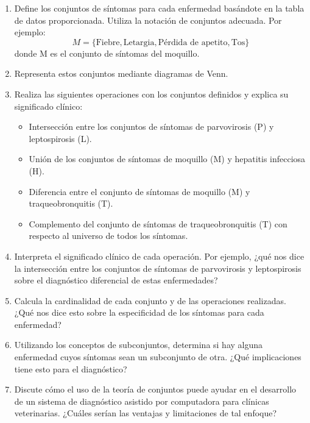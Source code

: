 \documentclass[a4,11pt]{aleph-notas}
\begin{document}
\begin{enumerate}
    \item Define los conjuntos de síntomas para cada enfermedad basándote en la tabla de datos proporcionada. Utiliza la notación de conjuntos adecuada. Por ejemplo:
    \[M = \{\text{Fiebre}, \text{Letargia}, \text{Pérdida de apetito}, \text{Tos}\}\]
    donde M es el conjunto de síntomas del moquillo.

    \item Representa estos conjuntos mediante diagramas de Venn.

    \item Realiza las siguientes operaciones con los conjuntos definidos y explica su significado clínico:
    \begin{itemize}
        \item Intersección entre los conjuntos de síntomas de parvovirosis (P) y leptospirosis (L).
        \item Unión de los conjuntos de síntomas de moquillo (M) y hepatitis infecciosa (H).
        \item Diferencia entre el conjunto de síntomas de moquillo (M) y traqueobronquitis (T).
        \item Complemento del conjunto de síntomas de traqueobronquitis (T) con respecto al universo de todos los síntomas.
    \end{itemize}

    \item Interpreta el significado clínico de cada operación. Por ejemplo, ¿qué nos dice la intersección entre los conjuntos de síntomas de parvovirosis y leptospirosis sobre el diagnóstico diferencial de estas enfermedades?

    \item Calcula la cardinalidad de cada conjunto y de las operaciones realizadas. ¿Qué nos dice esto sobre la especificidad de los síntomas para cada enfermedad?

    \item Utilizando los conceptos de subconjuntos, determina si hay alguna enfermedad cuyos síntomas sean un subconjunto de otra. ¿Qué implicaciones tiene esto para el diagnóstico?

    \item Discute cómo el uso de la teoría de conjuntos puede ayudar en el desarrollo de un sistema de diagnóstico asistido por computadora para clínicas veterinarias. ¿Cuáles serían las ventajas y limitaciones de tal enfoque?
\end{enumerate}
\end{document}
